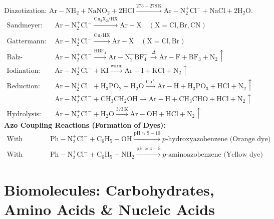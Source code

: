\documentclass[10pt,a4paper]{article}
\begin{document}
\begin{formulabox}
Diazotization: $\mathrm{Ar-NH_2} + \mathrm{NaNO_2} + 2\mathrm{HCl} \xrightarrow{273-278\,\mathrm{K}} \mathrm{Ar-N_2^+Cl^-} + \mathrm{NaCl} + 2\mathrm{H_2O}$.
\begin{align*}
  \text{Sandmeyer: } & \mathrm{Ar-N_2^+Cl^-} \xrightarrow{\mathrm{Cu_2X_2 / HX}} \mathrm{Ar-X} \quad (\mathrm{X=Cl, Br, CN})\\
  \text{Gattermann: } & \mathrm{Ar-N_2^+Cl^-} \xrightarrow{\mathrm{Cu / HX}} \mathrm{Ar-X} \quad (\mathrm{X=Cl, Br})\\
  \text{Balz-Schiemann: } & \mathrm{Ar-N_2^+Cl^-} \xrightarrow{\mathrm{HBF_4}} \mathrm{Ar-N_2^+BF_4^-} \xrightarrow{\Delta} \mathrm{Ar-F} + \mathrm{BF_3} + \mathrm{N}_2 \uparrow\\
  \text{Iodination: } & \mathrm{Ar-N_2^+Cl^-} + \mathrm{KI} \xrightarrow{\text{warm}} \mathrm{Ar-I} + \mathrm{KCl} + \mathrm{N}_2 \uparrow\\
  \text{Reduction: } & \mathrm{Ar-N_2^+Cl^-} + \mathrm{H_3PO_2 + H_2O} \xrightarrow{\mathrm{Cu}^+} \mathrm{Ar-H} + \mathrm{H_3PO_3} + \mathrm{HCl} + \mathrm{N}_2 \uparrow\\
  & \mathrm{Ar-N_2^+Cl^-} + \mathrm{CH_3CH_2OH} \longrightarrow \mathrm{Ar-H} + \mathrm{CH_3CHO} + \mathrm{HCl} + \mathrm{N}_2 \uparrow\\
  \text{Hydrolysis: } & \mathrm{Ar-N_2^+Cl^-} + \mathrm{H_2O} \xrightarrow{373\,\mathrm{K}} \mathrm{Ar-OH} + \mathrm{HCl} + \mathrm{N}_2 \uparrow
\end{align*}
\textbf{Azo Coupling Reactions (Formation of Dyes):}
\begin{align*}
  \text{With Phenol: } & \mathrm{Ph-N_2^+Cl^-} + \mathrm{C_6H_5-OH} \xrightarrow{\mathrm{pH} \approx 9-10} p\text{-hydroxyazobenzene (Orange dye)}\\
  \text{With Aniline: } & \mathrm{Ph-N_2^+Cl^-} + \mathrm{C_6H_5-NH_2} \xrightarrow{\mathrm{pH} \approx 4-5} p\text{-aminoazobenzene (Yellow dye)}
\end{align*}
\end{formulabox}

\section{Biomolecules: Carbohydrates, Amino Acids \& Nucleic Acids}
\end{document}
